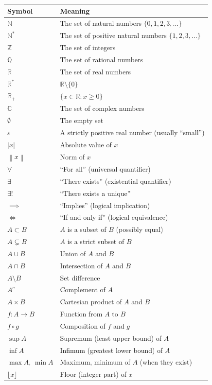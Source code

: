 \documentclass[12pt,a4paper,openany]{book}
\newcommand{\N}{\mathbb{N}}
\newcommand{\Z}{\mathbb{Z}}
\newcommand{\Q}{\mathbb{Q}}
\newcommand{\R}{\mathbb{R}}
\newcommand{\C}{\mathbb{C}}
\newcommand{\eps}{\varepsilon}
\newcommand{\abs}[1]{\left\lvert #1 \right\rvert}
\newcommand{\norm}[1]{\left\lVert #1 \right\rVert}
\theoremstyle{definition}
\theoremstyle{remark}
\begin{document}
\begin{tabular}{@{}l l@{}}
\toprule
\textbf{Symbol} & \textbf{Meaning} \\
\midrule
$\N$ & The set of natural numbers $\{0,1,2,3,\dots\}$ \\
$\N^*$ & The set of positive natural numbers $\{1,2,3,\dots\}$ \\
$\Z$ & The set of integers \\
$\Q$ & The set of rational numbers \\
$\R$ & The set of real numbers \\
$\R^*$ & $\R \setminus \{0\}$ \\
$\R_+$ & $\{x \in \R : x \geq 0\}$ \\
$\C$ & The set of complex numbers \\
$\emptyset$ & The empty set \\
$\eps$ & A strictly positive real number (usually ``small'') \\
$\abs{x}$ & Absolute value of $x$ \\
$\norm{x}$ & Norm of $x$ \\
$\forall$ & ``For all'' (universal quantifier) \\
$\exists$ & ``There exists'' (existential quantifier) \\
$\exists!$ & ``There exists a unique'' \\
$\implies$ & ``Implies'' (logical implication) \\
$\iff$ & ``If and only if'' (logical equivalence) \\
$A \subset B$ & $A$ is a subset of $B$ (possibly equal) \\
$A \subsetneq B$ & $A$ is a strict subset of $B$ \\
$A \cup B$ & Union of $A$ and $B$ \\
$A \cap B$ & Intersection of $A$ and $B$ \\
$A \setminus B$ & Set difference \\
$A^c$ & Complement of $A$ \\
$A \times B$ & Cartesian product of $A$ and $B$ \\
$f : A \to B$ & Function from $A$ to $B$ \\
$f \circ g$ & Composition of $f$ and $g$ \\
$\sup A$ & Supremum (least upper bound) of $A$ \\
$\inf A$ & Infimum (greatest lower bound) of $A$ \\
$\max A$, $\min A$ & Maximum, minimum of $A$ (when they exist) \\
$\lfloor x \rfloor$ & Floor (integer part) of $x$ \\
\bottomrule
\end{tabular}
\end{document}
